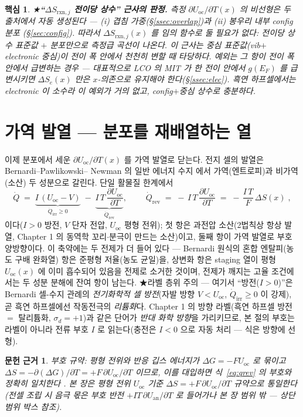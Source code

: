 \documentclass[11pt,a4paper]{article}
\newtheorem*{keybox}{핵심}
\newtheorem*{srcbox}{문헌 근거}
\newcommand{\rxn}{\mathrm{rxn}}
\newcommand{\rev}{\mathrm{rev}}
\newcommand{\irr}{\mathrm{irr}}
\newcommand{\oc}{\mathrm{oc}}
\begin{document}
\begin{keybox}
★\textbf{``$\Delta S_{\rxn,j}$ 전이당 상수'' 근사의 판정.} 측정 $\partial U_\oc/\partial T(x)$ 의 비선형은 두
출처에서 \emph{자동 생성}된다 — (i) 겹침 가중(\S\ref{ssec:overlap})과 (ii) 봉우리 내부 config 분포
(\S\ref{sec:config}). 따라서 $\Delta S_{\rxn,j}(x)$ 를 임의 함수로 둘 필요가 \emph{없다}: 전이당 \emph{상수}
표준값 $+$ 분포만으로 측정급 곡선이 나온다. 이 근사는 \emph{중심 표준값(vib$+$electronic 중심)이 전이 폭 안에서
천천히 변할 때} 타당하다. 예외는 그 항이 전이 폭 \emph{안에서} 급변하는 경우 — 대표적으로 LCO 의 MIT 가 한
전이 안에서 $g(E_F)$ 를 급변시키면 $\Delta S_e(x)$ 만은 $x$-의존으로 유지해야 한다(\S\ref{ssec:elec}). 흑연
하프셀에서는 electronic 이 소수라 이 예외가 거의 없고, config$+$중심 상수로 충분하다.
\end{keybox}

\section{가역 발열 — 분포를 재배열하는 열}\label{sec:revheat}
이제 분포에서 세운 $\partial U_\oc/\partial T(x)$ 를 가역 발열로 닫는다. 전지 셀의 발열은 Bernardi--Pawlikowski--
Newman 의 일반 에너지 수지 \cite{bernardi1985} 에서 가역(엔트로피)과 비가역(소산) 두 성분으로 갈린다. 단일
활물질 한계에서
\begin{equation}
\dot Q \;=\; \underbrace{I\,(U_\oc-V)}_{\dot Q_\irr\ge0}\;-\;\underbrace{I\,T\,\frac{\partial U_\oc}{\partial T}}_{\dot Q_\rev},
\qquad
\boxed{\;\dot Q_\rev \;=\; -\,I\,T\,\frac{\partial U_\oc}{\partial T}\;=\;-\,\frac{I\,T}{F}\,\Delta S(x)\;,}
\label{eq:qrev}
\end{equation}
이다($I>0$ 방전, $V$ 단자 전압, $U_\oc$ 평형 전위); 첫 항은 과전압 소산(2법칙상 항상 발열, Chapter 1 의
동역학 꼬리$\cdot$분극이 만드는 소산)이고, 둘째 항이 가역 발열로 부호 양방향이다. 이 축약에는 두 전제가
더 들어 있다 — Bernardi 원식의 혼합 엔탈피(농도 구배 완화열) 항은 준평형 저율(농도 균일)을, 상변화 항은
staging 열이 평형 $U_\oc(x)$ 에 이미 흡수되어 있음을 전제로 소거한 것이며, 전제가 깨지는 고율
조건에서는 두 성분 분해에 잔여 항이 남는다.
★라벨 층위 주의 — 여기서 ``방전($I>0$)''은 Bernardi 셀-수지 관례의 \emph{전기화학적 셀 방전}(자발 방향
$V<U_\oc$, $\dot Q_\irr\ge0$ 이 강제), 곧 흑연 하프셀에선 작동전극의 \emph{리튬화}다. Chapter 1 의 방향
라벨(흑연 하프셀 방전 $=$ 탈리튬화, $\sigma_d{=}+1$)과 같은 단어가 \emph{반대 화학 방향}을 가리키므로,
본 절의 부호는 라벨이 아니라 전류 부호 $I$ 로 읽는다(충전은 $I<0$ 으로 자동 처리 — 식은 방향에 선형).
\begin{srcbox}
부호 규약: 평형 전위와 반응 깁스 에너지가 $\Delta G=-FU_\oc$ 로 묶이고 $\Delta S=-\partial(\Delta G)/\partial T
=+F\,\partial U_\oc/\partial T$ 이므로, 이를 대입하면 식~\eqref{eq:qrev} 의 부호와 정확히 일치한다 \cite{newman,msmr_partI}. 본 장은 평형 전위 $U_\oc$ 기준 $\Delta S=+F\,\partial U_\oc/\partial T$ 규약으로 통일한다(전셀 조립 시 음극 몫은 부호 반전 $+IT\,\partial U_\mathrm{an}/\partial T$ 로 들어가나 본 장 범위 밖 — 상단 범위 박스 참조).
\end{srcbox}
\end{document}

